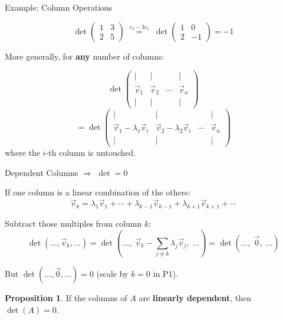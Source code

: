 \documentclass[10pt]{beamer}
\theoremstyle{definition}
\newtheorem{prop}{Proposition}[section]
\newcommand{\x}[1]{\alert{\textbf{#1}}}
\begin{document}
\begin{frame}{Example: Column Operations}

$$
\det\begin{pmatrix} 1 & 3 \\ 2 & 5 \end{pmatrix}
\;\stackrel{c_2 - 3c_1}{=}\;
\det\begin{pmatrix} 1 & 0 \\ 2 & -1 \end{pmatrix}
= -1
$$

\vfill

More generally, for \x{any} number of columns:

$$
\det\begin{pmatrix}
| & | & & | \\
\vec{v}_1 & \vec{v}_2 & \cdots & \vec{v}_n \\
| & | & & |
\end{pmatrix}
$$
$$
=\det\begin{pmatrix}
| & | & & | \\
\vec{v}_1 - \lambda_1\vec{v}_i & \vec{v}_2 - \lambda_2\vec{v}_i & \cdots & \vec{v}_n \\
| & | & & |
\end{pmatrix}
$$
where the $i$-th column is untouched.

\end{frame}


\begin{frame}{Dependent Columns $\Rightarrow$ $\det = 0$}

If one column is a linear combination of the others:
$$
\vec{v}_k = \lambda_1\vec{v}_1 + \cdots + \lambda_{k-1}\vec{v}_{k-1} + \lambda_{k+1}\vec{v}_{k+1} + \cdots
$$

\vfill

Subtract those multiples from column $k$:
$$
\det(\ldots,\vec{v}_k,\ldots)
= \det(\ldots,\;\vec{v}_k - \sum_{j\neq k}\lambda_j\vec{v}_j,\;\ldots)
= \det(\ldots,\;\vec{0},\;\ldots)
$$

\vfill

But $\det(\ldots,\vec{0},\ldots) = 0$ (scale by $k{=}0$ in P1).

\vfill

\begin{prop}
If the columns of $A$ are \x{linearly dependent}, then $\det(A)=0$.
\end{prop}

\end{frame}
\end{document}
